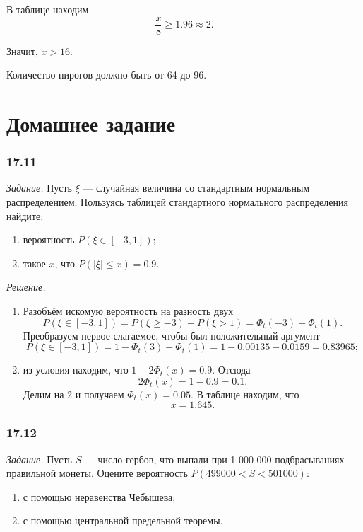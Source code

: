 В таблице находим
$$ \frac{x}{8} \geq
  1.96 \approx
  2.$$

Значит, $x > 16$.

Количество пирогов должно быть от 64 до 96.

\section*{Домашнее задание}

\subsubsection*{17.11}

\textit{Задание.} Пусть $ \xi $ --- случайная величина со стандартным нормальным распределением.
Пользуясь таблицей стандартного нормального распределения найдите:
\begin{enumerate}[label=\alph*)]
\item вероятность $P \left( \xi \in \left[ -3, 1 \right] \right) $;
\item такое $x$, что $P \left( \left| \xi \right| \leq x \right) = 0.9$.
\end{enumerate}

\textit{Решение.}
\begin{enumerate}[label=\alph*)]
\item Разобъём искомую вероятность на разность двух
$$P \left( \xi \in \left[ -3, 1 \right] \right) =
  P \left( \xi \geq -3 \right) - P \left( \xi > 1 \right) =
  \Phi_t \left( -3 \right) - \Phi_t \left( 1 \right).$$
Преобразуем первое слагаемое, чтобы был положительный аргумент
$$P \left( \xi \in \left[ -3, 1 \right] \right) =
  1 - \Phi_t \left( 3 \right) - \Phi_t \left( 1 \right) =
  1 - 0.00135 - 0.0159 =
  0.83965;$$
\item из условия находим, что $1 - 2 \Phi_t \left( x \right) = 0.9$.
Отсюда
$$2 \Phi_t \left( x \right) =
  1 - 0.9 =
  0.1.$$
Делим на $2$ и получаем $ \Phi_t \left( x \right) = 0.05$.
В таблице находим, что
$$x =
  1.645.$$
\end{enumerate}

\subsubsection*{17.12}

\textit{Задание.}
Пусть $S$ --- число гербов, что выпали при 1 000 000 подбрасываниях правильной монеты.
Оцените вероятность $P \left( 499000 < S < 501000 \right) $:
\begin{enumerate}[label=\alph*)]
\item с помощью неравенства Чебышева;
\item с помощью центральной предельной теоремы.
\end{enumerate}

